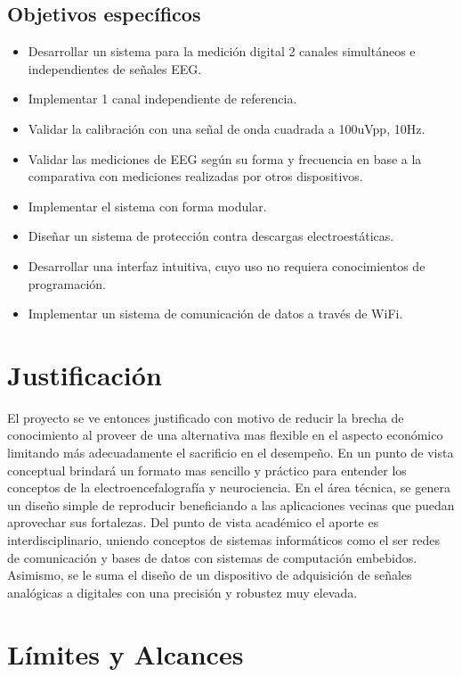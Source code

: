 \subsection{Objetivos específicos}
\label{sec:orgec72373}
\begin{itemize}
\item Desarrollar un sistema para la medición digital 2 canales simultáneos e independientes de señales EEG.
\item Implementar 1 canal independiente de referencia.
\item Validar la calibración con una señal de onda cuadrada a 100uVpp, 10Hz.
\item Validar las mediciones de EEG según su forma y frecuencia en base a la comparativa con mediciones realizadas por otros dispositivos.
\item Implementar el sistema con forma modular.
\item Diseñar un sistema de protección contra descargas electroestáticas.
\item Desarrollar una interfaz intuitiva, cuyo uso no requiera conocimientos de programación.
\item Implementar un sistema de comunicación de datos a través de WiFi.
\end{itemize}

\section{Justificación}
\label{sec:org10a5754}
El proyecto se ve entonces justificado con motivo de reducir la brecha de conocimiento al proveer de una alternativa mas flexible en el aspecto económico limitando más adecuadamente el sacrificio en el desempeño. En un punto de vista conceptual brindará un formato mas sencillo y práctico para entender los conceptos de la electroencefalografía y neurociencia. En el área técnica, se genera un diseño simple de reproducir beneficiando a las aplicaciones vecinas que puedan aprovechar sus fortalezas. Del punto de vista académico el aporte es interdisciplinario, uniendo conceptos de sistemas informáticos como el ser redes de comunicación y bases de datos con sistemas de computación embebidos. Asimismo, se le suma el diseño de un dispositivo de adquisición de señales analógicas a digitales con una precisión y robustez muy elevada.

\section{Límites y Alcances}
\label{sec:orgf901299}
